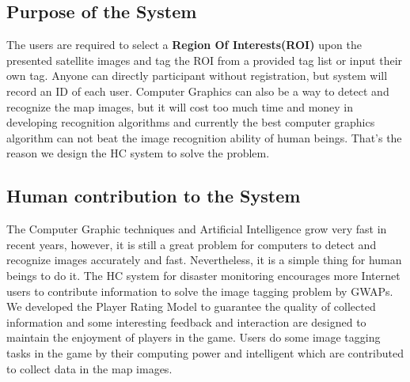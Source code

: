   \subsection{Purpose of the System}
  The users are required to select a \textbf{Region Of Interests(ROI)} upon the presented satellite images 
  and tag the ROI from a provided tag list or input their own tag. Anyone can directly participant 
  without registration, but system will record an ID of each user.
  Computer Graphics can also be a way to detect and recognize the map images, but it will cost 
  too much time and money in developing recognition algorithms and currently the best 
  computer graphics algorithm can not beat the image recognition ability of human beings. 
  That's the reason we design the HC system to solve the problem.

  \subsection{Human contribution to the System}
  The Computer Graphic techniques and Artificial Intelligence grow very fast in recent years, 
  however, it is still a great problem for computers to detect and recognize images accurately and fast.
  Nevertheless, it is a simple thing for human beings to do it.
  The HC system for disaster monitoring encourages more Internet users to contribute information 
  to solve the image tagging problem by GWAPs. 
  We developed the Player Rating Model to guarantee the quality of collected information 
  and some interesting feedback and interaction are designed to maintain the enjoyment of players in the game.
  Users do some image tagging tasks in the game by their computing power and intelligent 
  which are contributed to collect data in the map images.

